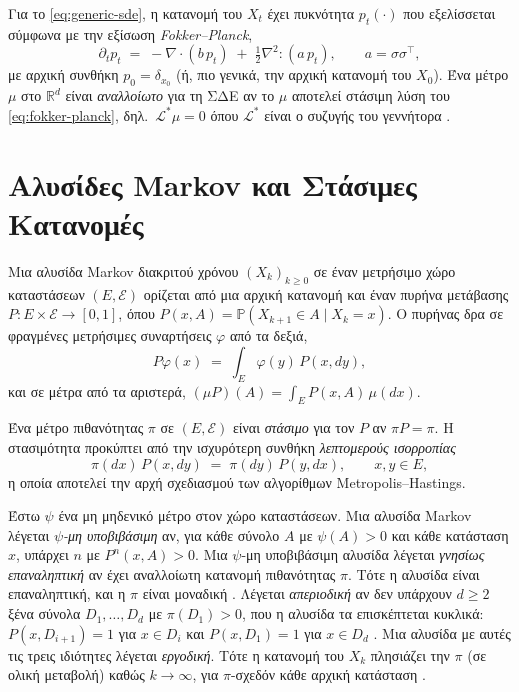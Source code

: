 Για το \eqref{eq:generic-sde}, η κατανομή του $X_t$ έχει πυκνότητα $p_t(\cdot)$
που εξελίσσεται σύμφωνα με την εξίσωση \emph{Fokker--Planck},
\begin{equation}
  \partial_t p_t \;=\; -\nabla \cdot (b\, p_t) \;+\; \tfrac12 \nabla^2 : (a\, p_t),
  \qquad a = \sigma\sigma^\top,
  \label{eq:fokker-planck}
\end{equation}
με αρχική συνθήκη $p_0 = \delta_{x_0}$ (ή, πιο γενικά, την αρχική κατανομή του
$X_0$). Ένα μέτρο $\mu$ στο $\mathbb{R}^d$ είναι \emph{αναλλοίωτο} για τη ΣΔΕ
αν το $\mu$ αποτελεί στάσιμη λύση του \eqref{eq:fokker-planck}, δηλ.\
$\mathcal{L}^* \mu = 0$ όπου $\mathcal{L}^*$ είναι ο συζυγής του γεννήτορα
\citep{pavliotis2014stochastic}.

\section{Αλυσίδες Markov και Στάσιμες Κατανομές}
\label{sec:bg-markov}

Μια αλυσίδα Markov διακριτού χρόνου $(X_k)_{k\geq 0}$ σε έναν μετρήσιμο χώρο
καταστάσεων $(E, \mathcal{E})$ ορίζεται από μια αρχική κατανομή και έναν πυρήνα
μετάβασης $P : E \times \mathcal{E} \to [0,1]$, όπου
$P(x, A) = \mathbb{P}(X_{k+1} \in A \mid X_k = x)$. Ο πυρήνας δρα σε φραγμένες
μετρήσιμες συναρτήσεις $\varphi$ από τα δεξιά,
\begin{equation}
  P\varphi(x) \;=\; \int_E \varphi(y)\, P(x, dy),
\end{equation}
και σε μέτρα από τα αριστερά, $(\mu P)(A) = \int_E P(x, A)\, \mu(dx)$.

Ένα μέτρο πιθανότητας $\pi$ σε $(E, \mathcal{E})$ είναι \emph{στάσιμο} για τον
$P$ αν $\pi P = \pi$. Η στασιμότητα προκύπτει από την ισχυρότερη συνθήκη
\emph{λεπτομερούς ισορροπίας}
\begin{equation}
  \pi(dx)\, P(x, dy) \;=\; \pi(dy)\, P(y, dx),
  \qquad x, y \in E,
  \label{eq:detailed-balance}
\end{equation}
η οποία αποτελεί την αρχή σχεδιασμού των αλγορίθμων Metropolis--Hastings.

Έστω $\psi$ ένα μη μηδενικό μέτρο στον χώρο καταστάσεων. Μια αλυσίδα Markov λέγεται
\emph{$\psi$-μη υποβιβάσιμη} αν, για κάθε σύνολο $A$ με $\psi(A) > 0$ και κάθε
κατάσταση $x$, υπάρχει $n$ με $P^n(x, A) > 0$. Μια $\psi$-μη υποβιβάσιμη αλυσίδα
λέγεται \emph{γνησίως επαναληπτική} αν έχει αναλλοίωτη κατανομή πιθανότητας $\pi$. Τότε
η αλυσίδα είναι επαναληπτική, και η $\pi$ είναι μοναδική
\citep[§10.1]{meyn2009markov}.
Λέγεται \emph{απεριοδική} αν δεν υπάρχουν $d \ge 2$ ξένα σύνολα $D_1, \ldots, D_d$ με
$\pi(D_1) > 0$, που η αλυσίδα τα επισκέπτεται κυκλικά: $P(x, D_{i+1}) = 1$ για
$x \in D_i$ και $P(x, D_1) = 1$ για $x \in D_d$ \citep{roberts2004general}. Μια αλυσίδα με αυτές
τις τρεις ιδιότητες λέγεται \emph{εργοδική}. Τότε η κατανομή του $X_k$ πλησιάζει την
$\pi$ (σε ολική μεταβολή) καθώς $k \to \infty$, για $\pi$-σχεδόν κάθε αρχική κατάσταση
\citep[Theorem~4]{roberts2004general}.

